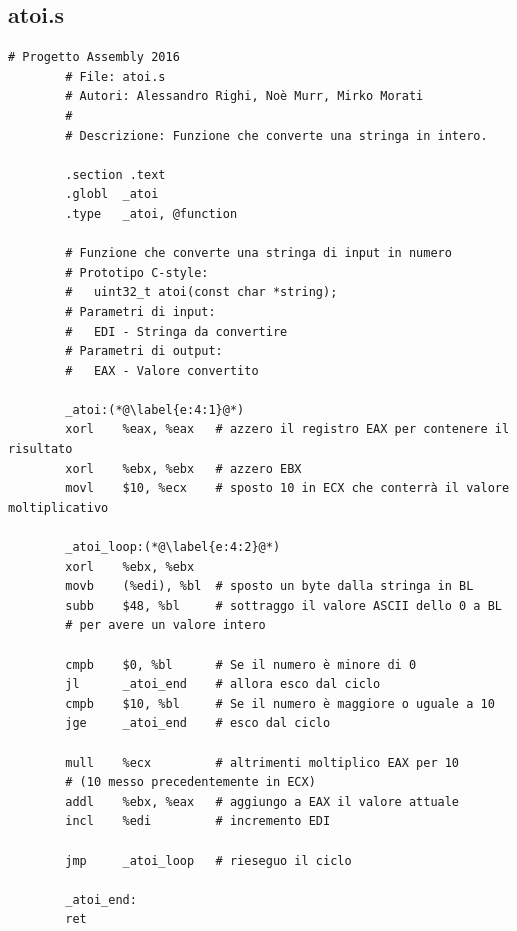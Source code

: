 \documentclass[a4paper,11pt]{article}
\begin{document}
		\subsection{atoi.s}
		\begin{lstlisting}[language=MyAssembler, style=MyAsm]
		# Progetto Assembly 2016
		# File: atoi.s
		# Autori: Alessandro Righi, Noè Murr, Mirko Morati
		#
		# Descrizione: Funzione che converte una stringa in intero.
		
		.section .text
		.globl	_atoi
		.type	_atoi, @function
		
		# Funzione che converte una stringa di input in numero
		# Prototipo C-style:
		#   uint32_t atoi(const char *string);
		# Parametri di input:
		#   EDI - Stringa da convertire
		# Parametri di output:
		#   EAX - Valore convertito
		
		_atoi:(*@\label{e:4:1}@*)
		xorl	%eax, %eax   # azzero il registro EAX per contenere il risultato
		xorl	%ebx, %ebx   # azzero EBX
		movl	$10, %ecx    # sposto 10 in ECX che conterrà il valore moltiplicativo
		
		_atoi_loop:(*@\label{e:4:2}@*)
		xorl	%ebx, %ebx
		movb	(%edi), %bl  # sposto un byte dalla stringa in BL
		subb	$48, %bl     # sottraggo il valore ASCII dello 0 a BL
		# per avere un valore intero
		
		cmpb	$0, %bl      # Se il numero è minore di 0
		jl		_atoi_end    # allora esco dal ciclo
		cmpb	$10, %bl     # Se il numero è maggiore o uguale a 10
		jge 	_atoi_end    # esco dal ciclo
		
		mull	%ecx         # altrimenti moltiplico EAX per 10
		# (10 messo precedentemente in ECX)
		addl	%ebx, %eax   # aggiungo a EAX il valore attuale
		incl	%edi         # incremento EDI
		
		jmp		_atoi_loop   # rieseguo il ciclo
		
		_atoi_end:
		ret
		\end{lstlisting}
		
		\newpage
\end{document}
